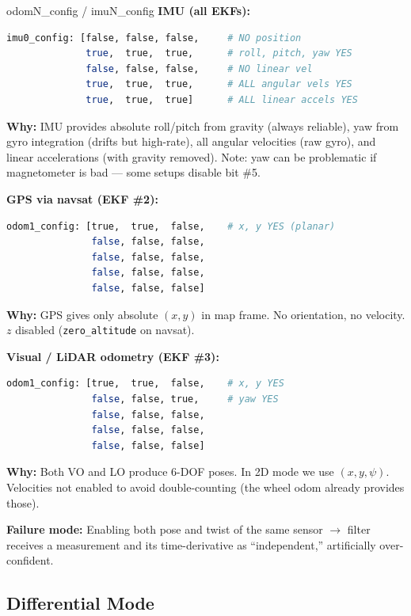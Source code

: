 \documentclass[11pt,a4paper]{article}
\begin{document}
\begin{paramcard}{odomN\_config / imuN\_config}
\textbf{IMU (all EKFs):}
\begin{lstlisting}[language=bash]
imu0_config: [false, false, false,     # NO position
              true,  true,  true,      # roll, pitch, yaw YES
              false, false, false,     # NO linear vel
              true,  true,  true,      # ALL angular vels YES
              true,  true,  true]      # ALL linear accels YES
\end{lstlisting}
\textbf{Why:} IMU provides absolute roll/pitch from gravity (always reliable), yaw from gyro integration (drifts but high-rate), all angular velocities (raw gyro), and linear accelerations (with gravity removed). Note: yaw can be problematic if magnetometer is bad --- some setups disable bit \#5.

\textbf{GPS via navsat (EKF \#2):}
\begin{lstlisting}[language=bash]
odom1_config: [true,  true,  false,    # x, y YES (planar)
               false, false, false,
               false, false, false,
               false, false, false,
               false, false, false]
\end{lstlisting}
\textbf{Why:} GPS gives only absolute $(x, y)$ in map frame. No orientation, no velocity. $z$ disabled (\texttt{zero\_altitude} on navsat).

\textbf{Visual / LiDAR odometry (EKF \#3):}
\begin{lstlisting}[language=bash]
odom1_config: [true,  true,  false,    # x, y YES
               false, false, true,     # yaw YES
               false, false, false,
               false, false, false,
               false, false, false]
\end{lstlisting}
\textbf{Why:} Both VO and LO produce 6-DOF poses. In 2D mode we use $(x, y, \psi)$. Velocities not enabled to avoid double-counting (the wheel odom already provides those).

\textbf{Failure mode:} Enabling both pose and twist of the same sensor $\to$ filter receives a measurement and its time-derivative as ``independent,'' artificially over-confident.
\end{paramcard}

\subsection{Differential Mode}
\end{document}
